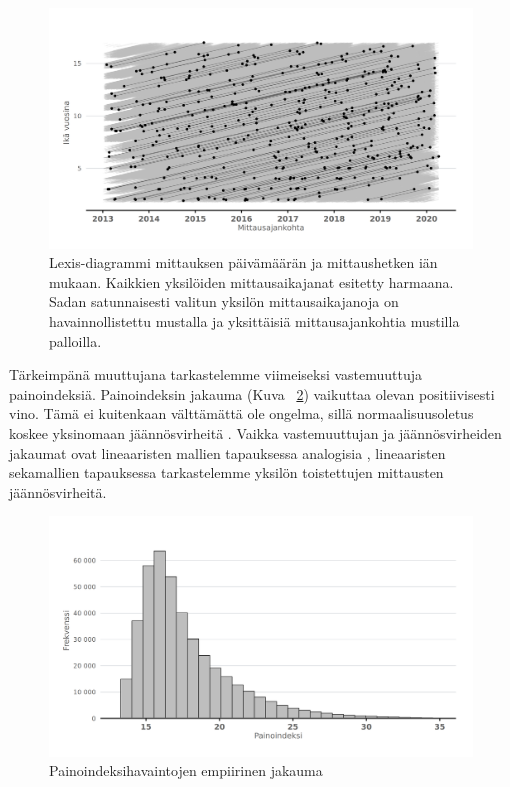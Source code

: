 \documentclass[finnish]{docopts}
\begin{document}
\begin{figure}[H]
\centering
  \includegraphics[scale=0.8]{kuvaajat/lex_plot.png}
  \caption{Lexis-diagrammi mittauksen päivämäärän ja mittaushetken iän mukaan. Kaikkien yksilöiden mittausaikajanat esitetty harmaana. Sadan satunnaisesti valitun yksilön mittausaikajanoja on havainnollistettu mustalla ja yksittäisiä mittausajankohtia mustilla palloilla.}
  \label{fig:lexisplot}
\end{figure}

Tärkeimpänä muuttujana tarkastelemme viimeiseksi vastemuuttuja painoindeksiä. Painoindeksin jakauma (Kuva ~\ref{fig:bmi_dens}) vaikuttaa olevan positiivisesti vino. Tämä ei kuitenkaan välttämättä ole ongelma, sillä normaalisuusoletus koskee yksinomaan jäännösvirheitä \cite{west14}. Vaikka vastemuuttujan ja jäännösvirheiden jakaumat ovat lineaaristen mallien tapauksessa analogisia \cite{fitzmaurice11}, lineaaristen sekamallien tapauksessa tarkastelemme yksilön toistettujen mittausten jäännösvirheitä.\\

\begin{figure}[ht]
\centering
  \includegraphics[scale=0.8]{kuvaajat/bmi_dens.png}
  \caption{Painoindeksihavaintojen empiirinen jakauma}
  \label{fig:bmi_dens}
\end{figure}
\end{document}
